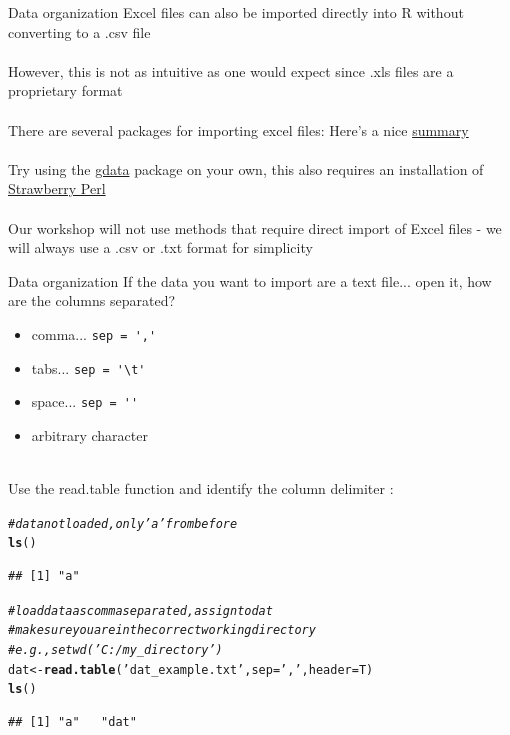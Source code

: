\documentclass[xcolor=svgnames]{beamer}\usepackage[]{graphicx}\usepackage[]{color}
\makeatletter
\newcommand{\hlstr}[1]{\textcolor[rgb]{0.192,0.494,0.8}{#1}}%
\newcommand{\hlcom}[1]{\textcolor[rgb]{0.678,0.584,0.686}{\textit{#1}}}%
\newcommand{\hlstd}[1]{\textcolor[rgb]{0.345,0.345,0.345}{#1}}%
\newcommand{\hlkwb}[1]{\textcolor[rgb]{0.69,0.353,0.396}{#1}}%
\newcommand{\hlkwc}[1]{\textcolor[rgb]{0.333,0.667,0.333}{#1}}%
\newcommand{\hlkwd}[1]{\textcolor[rgb]{0.737,0.353,0.396}{\textbf{#1}}}%
\newenvironment{kframe}{%
 \def\at@end@of@kframe{}%
 \ifinner\ifhmode%
  \def\at@end@of@kframe{\end{minipage}}%
  \begin{minipage}{\columnwidth}%
 \fi\fi%
 \def\FrameCommand##1{\hskip\@totalleftmargin \hskip-\fboxsep
 \colorbox{shadecolor}{##1}\hskip-\fboxsep
     \hskip-\linewidth \hskip-\@totalleftmargin \hskip\columnwidth}%
 \MakeFramed {\advance\hsize-\width
   \@totalleftmargin\z@ \linewidth\hsize
   \@setminipage}}%
 {\par\unskip\endMakeFramed%
 \at@end@of@kframe}
\newenvironment{knitrout}{}{} %
\makeatother
\begin{document}
\begin{frame}{Data organization}
Excel files can also be imported directly into R without converting to a .csv file \\~\\
However, this is not as intuitive as one would expect since .xls files are a proprietary format \\~\\
There are several packages for importing excel files: Here's a nice \href{http://www.r-bloggers.com/a-million-ways-to-connect-r-and-excel/}{summary} \\~\\
Try using the \href{http://cran.r-project.org/web/packages/gdata/gdata.pdf}{gdata} package on your own, this also requires an installation of \href{http://strawberryperl.com/}{Strawberry Perl}\\~\\
Our workshop will not use methods that require direct import of Excel files - we will always use a .csv or .txt format for simplicity
\end{frame}

\begin{frame}{Data organization}
If the data you want to import are a text file... open it, how are the columns separated?
\begin{itemize}
\item comma... \verb!sep = ','!
\item tabs... \verb!sep = '\t'!
\item space... \verb!sep = ''!
\item arbitrary character\\~\\
\end{itemize}
\pause
Use the read.table function and identify the column delimiter :
\begin{knitrout}\scriptsize
{}\color{fgcolor}\begin{kframe}
\begin{alltt}
\hlcom{# data not loaded, only 'a' from before}
\hlkwd{ls}\hlstd{()}
\end{alltt}
\begin{verbatim}
## [1] "a"
\end{verbatim}
\begin{alltt}
\hlcom{# load data as comma separated, assign to dat}
\hlcom{# make sure you are in the correct working directory}
\hlcom{# e.g., setwd('C:/my_directory') }
\hlstd{dat} \hlkwb{<-} \hlkwd{read.table}\hlstd{(}\hlstr{'dat_example.txt'}\hlstd{,}\hlkwc{sep} \hlstd{=} \hlstr{','}\hlstd{,} \hlkwc{header} \hlstd{= T)}
\hlkwd{ls}\hlstd{()}
\end{alltt}
\begin{verbatim}
## [1] "a"   "dat"
\end{verbatim}
\end{kframe}
\end{knitrout}
\end{frame}
\end{document}

